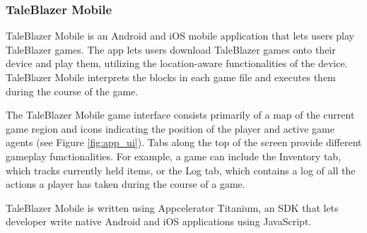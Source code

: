 \subsubsection{TaleBlazer Mobile}

TaleBlazer Mobile is an Android and iOS mobile application that lets users play TaleBlazer games. The app lets users download TaleBlazer games onto their device and play them, utilizing the location-aware functionalities of the device. TaleBlazer Mobile interprets the blocks in each game file and executes them during the course of the game.

The TaleBlazer Mobile game interface consists primarily of a map of the current game region and icons indicating the position of the player and active game agents (see Figure \ref{fig:app_ui}). Tabs along the top of the screen provide different gameplay functionalities. For example, a game can include the Inventory tab, which tracks currently held items, or the Log tab, which contains a log of all the actions a player has taken during the course of a game.

TaleBlazer Mobile is written using Appcelerator Titanium, an SDK that lets developer write native Android and iOS applications using JavaScript. 

